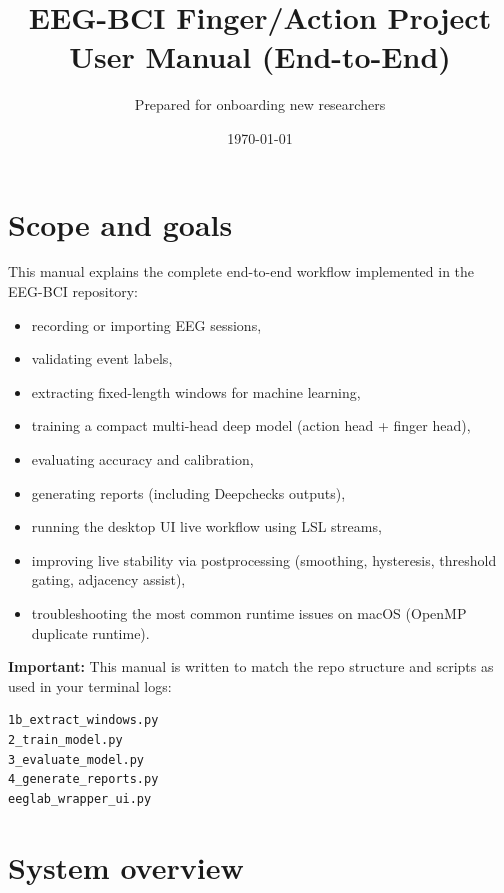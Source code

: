 \documentclass[11pt]{article}
\title{\textbf{EEG-BCI Finger/Action Project}\\User Manual (End-to-End)}
\author{Prepared for onboarding new researchers}
\date{\today}
\begin{document}
\maketitle
\tableofcontents
\newpage

\section{Scope and goals}
This manual explains the complete end-to-end workflow implemented in the EEG-BCI repository:
\begin{itemize}[leftmargin=*]
\item recording or importing EEG sessions,
\item validating event labels,
\item extracting fixed-length windows for machine learning,
\item training a compact multi-head deep model (action head + finger head),
\item evaluating accuracy and calibration,
\item generating reports (including Deepchecks outputs),
\item running the desktop UI live workflow using LSL streams,
\item improving live stability via postprocessing (smoothing, hysteresis, threshold gating, adjacency assist),
\item troubleshooting the most common runtime issues on macOS (OpenMP duplicate runtime).
\end{itemize}

\textbf{Important:} This manual is written to match the repo structure and scripts as used in your terminal logs:
\begin{lstlisting}
1b_extract_windows.py
2_train_model.py
3_evaluate_model.py
4_generate_reports.py
eeglab_wrapper_ui.py
\end{lstlisting}

\section{System overview}
\end{document}
